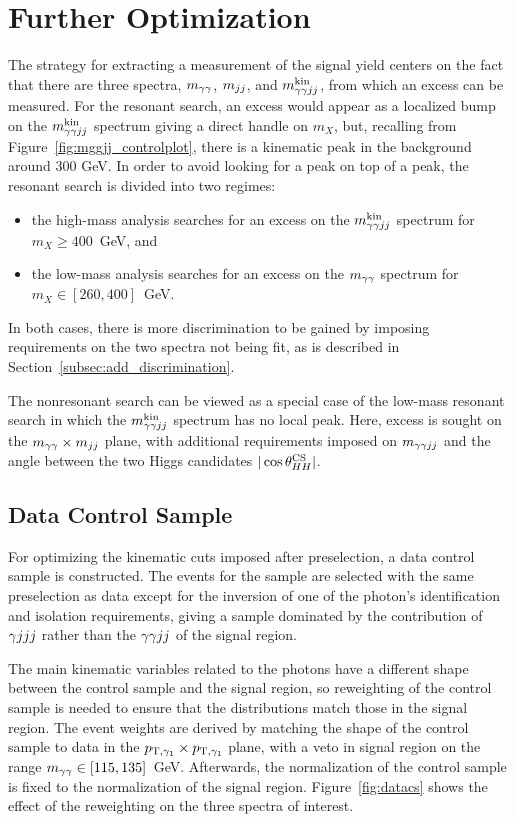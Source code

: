 \section{Further Optimization\label{sec:extraction}}

The strategy for extracting a measurement of the signal yield centers on the fact that there
are three spectra, $m_{\gamma\gamma}$, $m_{jj}$, and $m_{\gamma\gamma jj}^{\rm kin}$, from which an excess can be measured.
For the resonant search, an excess would appear as a localized bump on the
$m_{\gamma\gamma jj}^{\rm kin}$ spectrum giving a direct handle on $m_X$,
but, recalling from Figure~\ref{fig:mggjj_controlplot}, there is a kinematic peak in the background
around 300 GeV. In order to avoid looking for a peak on top of a peak, the resonant search is
divided into two regimes:
\begin{itemize}
\item the high-mass analysis searches for an excess on the $m_{\gamma\gamma jj}^{\rm kin}$ spectrum for $m_X \ge 400$~GeV, and
\item the low-mass analysis searches for an excess on the $m_{\gamma\gamma}$ spectrum for $m_X \in [260, 400]$~GeV.
\end{itemize}
In both cases, there is more discrimination to be gained by imposing requirements on the two spectra
not being fit, as is described in Section~\ref{subsec:add_discrimination}.

The nonresonant search can be viewed as a special case of the low-mass resonant search in which
the $m_{\gamma\gamma jj}^{\rm kin}$ spectrum has no local peak. Here, excess is sought on the $m_{\gamma\gamma} \times m_{jj}$ plane,
with additional requirements imposed on $m_{\gamma\gamma jj}$ and the angle between the two Higgs candidates
$|\cos {\theta^{\rm CS}_{HH}}|$.

\subsection{Data Control Sample\label{subsec:dataCS}}

For optimizing the kinematic cuts imposed after preselection, a data control sample is constructed.
The events for the sample are selected with the same preselection as data except for
the inversion of one of the photon's identification and isolation requirements, giving a sample
dominated by the contribution of $\gamma jjj$ rather than the $\gamma\gamma jj$ of the signal region.

The main kinematic variables related to the photons have a different shape
between the control sample and the
signal region, so reweighting of the control sample is needed to ensure that the distributions
match those in the signal region. The event weights are derived by matching the shape
of the control sample to data in the $p_{{\rm T},\gamma_1} \times p_{{\rm T},\gamma_1}$ plane,
with a veto in signal region on the range $m_{\gamma\gamma} \in [115, 135]$~GeV. Afterwards,
the normalization of the control sample is fixed to the normalization of the signal
region. Figure~\ref{fig:datacs}
shows the effect of the reweighting on the three spectra of interest.

